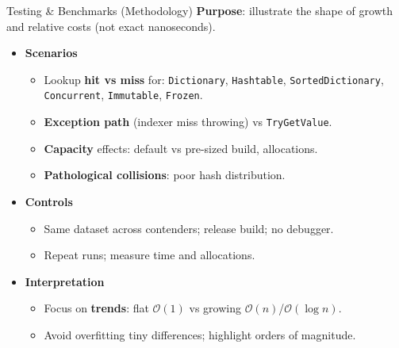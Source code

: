 \documentclass[aspectratio=169]{beamer}
\newcommand{\bigO}[1]{$\mathcal{O}(#1)$}
\newcommand{\code}[1]{\texttt{#1}}
\begin{document}
\begin{frame}{Testing \& Benchmarks (Methodology)}
  \textbf{Purpose}: illustrate the shape of growth and relative costs (not exact nanoseconds).
  \begin{itemize}
    \item \textbf{Scenarios}
      \begin{itemize}
        \item Lookup \textbf{hit vs miss} for: \code{Dictionary}, \code{Hashtable}, \code{SortedDictionary}, \code{Concurrent}, \code{Immutable}, \code{Frozen}.
        \item \textbf{Exception path} (indexer miss throwing) vs \code{TryGetValue}.
        \item \textbf{Capacity} effects: default vs pre-sized build, allocations.
        \item \textbf{Pathological collisions}: poor hash distribution.
      \end{itemize}
    \item \textbf{Controls}
      \begin{itemize}
        \item Same dataset across contenders; release build; no debugger.
        \item Repeat runs; measure time and allocations.
      \end{itemize}
    \item \textbf{Interpretation}
      \begin{itemize}
        \item Focus on \textbf{trends}: flat \bigO{1} vs growing \bigO{n}/\bigO{\log n}.
        \item Avoid overfitting tiny differences; highlight orders of magnitude.
      \end{itemize}
  \end{itemize}
\end{frame}
\end{document}
